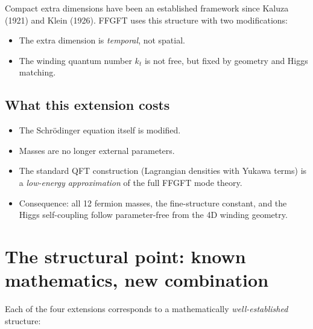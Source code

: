 Compact extra dimensions have been an established framework since
Kaluza (1921) and Klein (1926). FFGFT uses this structure with two
modifications:
\begin{itemize}[leftmargin=2em,itemsep=2pt,topsep=2pt]
  \item The extra dimension is \emph{temporal}, not spatial.
  \item The winding quantum number $k_t$ is not free, but fixed by
        geometry and Higgs matching.
\end{itemize}

\subsection{What this extension costs}

\begin{itemize}[leftmargin=2em,itemsep=2pt,topsep=2pt]
  \item The Schrödinger equation itself is modified.
  \item Masses are no longer external parameters.
  \item The standard QFT construction (Lagrangian densities with
        Yukawa terms) is a \emph{low-energy approximation} of the
        full FFGFT mode theory.
  \item Consequence: all 12 fermion masses, the fine-structure
        constant, and the Higgs self-coupling follow parameter-free
        from the 4D winding geometry.
\end{itemize}

\section{The structural point: known mathematics, new combination}

Each of the four extensions corresponds to a mathematically
\emph{well-established} structure:

\begin{center}
\renewcommand{\arraystretch}{1.4}
{\small
{}
}
\renewcommand{\arraystretch}{1.0}
\end{center}

